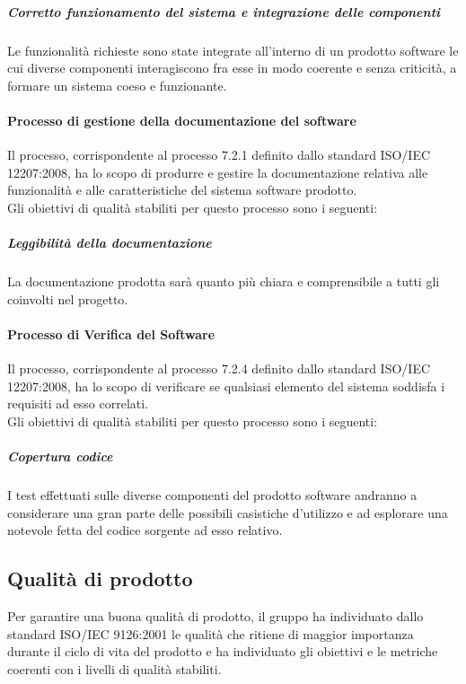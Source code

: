 				\subparagraph{Corretto funzionamento del sistema e integrazione delle componenti}
				Le funzionalità richieste sono state integrate all'interno di un prodotto software le cui diverse componenti interagiscono fra esse in modo coerente e senza criticità, a formare un sistema coeso e funzionante.
			\paragraph{Processo di gestione della documentazione del software}
			Il processo, corrispondente al processo 7.2.1 definito dallo standard ISO/IEC 12207:2008, ha lo scopo di produrre e gestire la documentazione relativa alle funzionalità e alle caratteristiche del sistema software prodotto.
\\Gli obiettivi di qualità stabiliti per questo processo sono i seguenti:

				\subparagraph{Leggibilità della documentazione}
				La documentazione prodotta sarà quanto più chiara e comprensibile a tutti gli  coinvolti nel progetto.
			\paragraph{Processo di Verifica del Software}
			Il processo, corrispondente al processo 7.2.4 definito dallo standard ISO/IEC 12207:2008, ha lo scopo di verificare se qualsiasi elemento del sistema soddisfa i requisiti ad esso correlati.
\\Gli obiettivi di qualità stabiliti per questo processo sono i seguenti:

				\subparagraph{Copertura codice}
				I test effettuati sulle diverse componenti del prodotto software andranno a considerare una gran parte delle possibili casistiche d'utilizzo e ad esplorare una notevole fetta del codice sorgente ad esso relativo.
	\subsection{Qualità di prodotto}
	Per garantire una buona qualità di prodotto, il gruppo \hx{} ha individuato dallo standard ISO/IEC 9126:2001 le qualità che ritiene di maggior importanza durante il ciclo di vita del prodotto e ha individuato gli obiettivi e le metriche coerenti con i livelli di qualità stabiliti.
